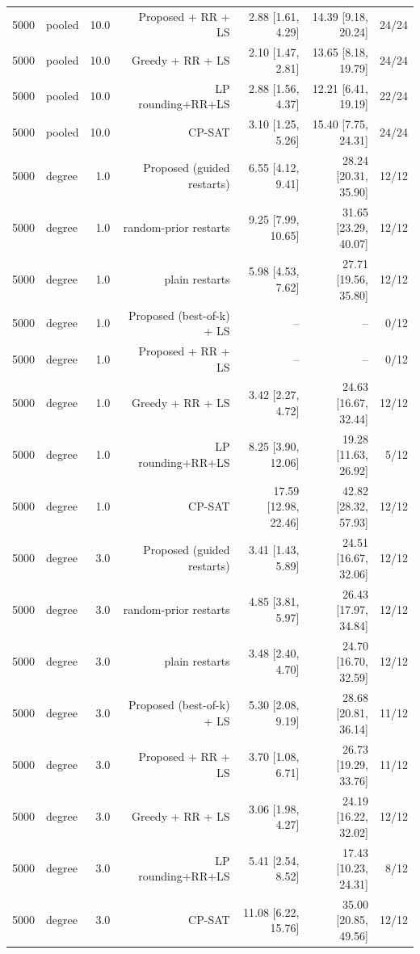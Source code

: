 \begin{table}[t]
\begin{tabular}{llrrrrr}
5000 & pooled & 10.0 & Proposed + RR + LS & 2.88 [1.61, 4.29] & 14.39 [9.18, 20.24] & 24/24 \\
5000 & pooled & 10.0 & Greedy + RR + LS & 2.10 [1.47, 2.81] & 13.65 [8.18, 19.79] & 24/24 \\
5000 & pooled & 10.0 & LP rounding+RR+LS & 2.88 [1.56, 4.37] & 12.21 [6.41, 19.19] & 22/24 \\
5000 & pooled & 10.0 & CP-SAT & 3.10 [1.25, 5.26] & 15.40 [7.75, 24.31] & 24/24 \\
5000 & degree & 1.0 & Proposed (guided restarts) & 6.55 [4.12, 9.41] & 28.24 [20.31, 35.90] & 12/12 \\
5000 & degree & 1.0 & random-prior restarts & 9.25 [7.99, 10.65] & 31.65 [23.29, 40.07] & 12/12 \\
5000 & degree & 1.0 & plain restarts & 5.98 [4.53, 7.62] & 27.71 [19.56, 35.80] & 12/12 \\
5000 & degree & 1.0 & Proposed (best-of-k) + LS & -- & -- & 0/12 \\
5000 & degree & 1.0 & Proposed + RR + LS & -- & -- & 0/12 \\
5000 & degree & 1.0 & Greedy + RR + LS & 3.42 [2.27, 4.72] & 24.63 [16.67, 32.44] & 12/12 \\
5000 & degree & 1.0 & LP rounding+RR+LS & 8.25 [3.90, 12.06] & 19.28 [11.63, 26.92] & 5/12 \\
5000 & degree & 1.0 & CP-SAT & 17.59 [12.98, 22.46] & 42.82 [28.32, 57.93] & 12/12 \\
5000 & degree & 3.0 & Proposed (guided restarts) & 3.41 [1.43, 5.89] & 24.51 [16.67, 32.06] & 12/12 \\
5000 & degree & 3.0 & random-prior restarts & 4.85 [3.81, 5.97] & 26.43 [17.97, 34.84] & 12/12 \\
5000 & degree & 3.0 & plain restarts & 3.48 [2.40, 4.70] & 24.70 [16.70, 32.59] & 12/12 \\
5000 & degree & 3.0 & Proposed (best-of-k) + LS & 5.30 [2.08, 9.19] & 28.68 [20.81, 36.14] & 11/12 \\
5000 & degree & 3.0 & Proposed + RR + LS & 3.70 [1.08, 6.71] & 26.73 [19.29, 33.76] & 11/12 \\
5000 & degree & 3.0 & Greedy + RR + LS & 3.06 [1.98, 4.27] & 24.19 [16.22, 32.02] & 12/12 \\
5000 & degree & 3.0 & LP rounding+RR+LS & 5.41 [2.54, 8.52] & 17.43 [10.23, 24.31] & 8/12 \\
5000 & degree & 3.0 & CP-SAT & 11.08 [6.22, 15.76] & 35.00 [20.85, 49.56] & 12/12 \\

\end{tabular}
\end{table}
